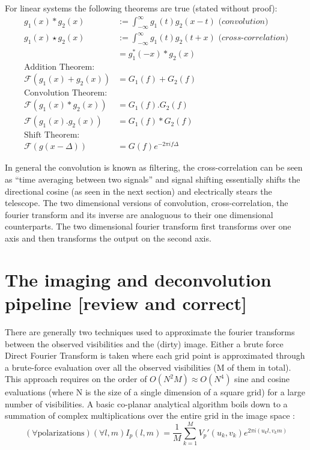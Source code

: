 \documentclass[a4paper,10pt]{report}
\begin{document}
For linear systems the following theorems are true (stated without proof):
\begin{equation*}
  \begin{split}
    g_1(x)*g_2(x) &:= \int_{-\infty}^{\infty}g_1(t)g_2(x-t)\textit{ (convolution)}\\
    g_1(x)\star g_2(x) &:= \int_{-\infty}^{\infty}g_1(t)g_2(t+x)\textit{ (cross-correlation)}\\
    &=g_1^*(-x)*g_2(x)\\
    \text{Addition Theorem:}\\
    \mathcal{F}(g_1(x)+g_2(x)) &= G_1(f)+G_2(f)\\
    \text{Convolution Theorem:}\\
    \mathcal{F}(g_1(x)*g_2(x)) &=G_1(f).G_2(f)\\
    \mathcal{F}(g_1(x).g_2(x)) &=G_1(f)*G_2(f)\\
    \text{Shift Theorem:}\\
    \mathcal{F}(g(x-\Delta))&=G(f)e^{-2\pi if\Delta}
  \end{split}
\end{equation*}

In general the convolution is known as filtering, the cross-correlation can be seen as ``time averaging between two signals'' and signal shifting essentially shifts the directional cosine (as seen in the next section) and electrically
stears the telescope. The two dimensional versions of convolution, cross-correlation, the fourier transform and its inverse are analoguous to their one dimensional counterparts. The two dimensional fourier transform first transforms
over one axis and then transforms the output on the second axis. 
 \section{The imaging and deconvolution pipeline [review and correct]}
 There are generally two techniques used to approximate the fourier transforms between the observed visibilities and the (dirty) image. Either a brute force Direct Fourier Transform is taken where each grid point is approximated through a brute-force
 evaluation over all the observed visibilities (M of them in total). This approach requires on the order of $O(N^2M) \approx O(N^4)$ sine and cosine evaluations (where N is the size of a single dimension of a square grid) for a large number of visibilities. A basic co-planar analytical 
 algorithm boils down to a summation of complex multiplications over the entire grid in the image space \cite[Lecture 7]{taylor1999synthesis}: 
 \begin{equation}
  (\forall \text{polarizations})(\forall l,m) I_{p}(l,m) = \frac{1}{M}\sum_{k=1}^{M}{V_p'(u_k,v_k)e^{2\pi i (u_kl,v_km)}}
 \end{equation}
 
\end{document}
